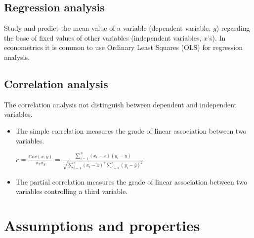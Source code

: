 \documentclass[10pt, a4paper, landscape]{extarticle}
\begin{document}
\begin{multicols}{3}
	\subsection*{Regression analysis}
		Study and predict the mean value of a variable (dependent variable, $y$) regarding the base of fixed values of other variables (independent variables, $x$'s). In econometrics it is common to use Ordinary Least Squares (OLS) for regression analysis.
	\subsection*{Correlation analysis}
		The correlation analysis not distinguish between dependent and independent variables.
		\begin{itemize}[leftmargin=*]
			\item The simple correlation measures the grade of linear association between two variables.
			\begin{center}
				$r = \frac{Cov(x,y)}{\sigma_x \sigma_y} = \frac{\sum_{i=1}^n (x_i - \overline{x})(y_i - \overline{y})}{\sqrt{\sum_{i=1}^n (x_i - \overline{x})^2 \sum_{i=1}^n (y_i - \overline{y})^2}}$
			\end{center}
			\item The partial correlation measures the grade of linear association between two variables controlling a third variable.
		\end{itemize}
\columnbreak
\section*{Assumptions and properties}

\end{multicols}
\end{document}
